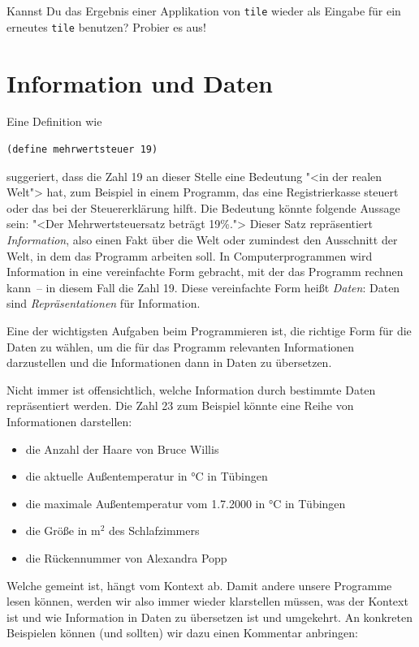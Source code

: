 \begin{aufgabeinline}
  Kannst Du das Ergebnis einer Applikation von
  \lstinline{tile} wieder als Eingabe für ein erneutes
  \lstinline{tile} benutzen?  Probier es aus!
\end{aufgabeinline}

\section{Information und Daten}
\label{sec:information-daten}

Eine Definition wie
%
\begin{lstlisting}
(define mehrwertsteuer 19)
\end{lstlisting}
%
suggeriert, dass die Zahl 19 an dieser Stelle eine Bedeutung "<in der
realen Welt"> hat, zum Beispiel in einem Programm, das eine Registrierkasse
steuert oder das bei der Steuererklärung hilft.  Die Bedeutung könnte
folgende Aussage sein: "<Der Mehrwertsteuersatz beträgt 19\%.">
Dieser Satz repräsentiert \textit{Information},
also einen Fakt über die Welt oder zumindest den Ausschnitt der Welt, in
dem das Programm arbeiten soll.  In Computerprogrammen wird
Information in eine vereinfachte Form gebracht, mit der das Programm
rechnen kann~-- in diesem Fall die Zahl 19.  Diese vereinfachte Form
heißt \textit{Daten}: Daten sind
\textit{Repräsentationen} für Information.

Eine der wichtigsten Aufgaben beim Programmieren ist, die richtige
Form für die Daten zu wählen, um die für das Programm relevanten
Informationen darzustellen und die Informationen dann in Daten zu
übersetzen.

Nicht immer ist offensichtlich, welche Information durch bestimmte
Daten repräsentiert werden.  Die Zahl 23 zum Beispiel könnte eine Reihe
von Informationen darstellen:
%
\begin{itemize}
\item die Anzahl der Haare von Bruce Willis
\item die aktuelle Außentemperatur in °C in Tübingen
\item die maximale Außentemperatur vom 1.7.2000 in °C in Tübingen
\item die Größe in m$^2$ des Schlafzimmers
\item die Rückennummer von Alexandra Popp
\end{itemize}
%
Welche gemeint ist, hängt vom Kontext ab.  Damit andere unsere
Programme lesen können, werden wir also immer wieder klarstellen
müssen, was der Kontext ist und wie Information in Daten zu übersetzen
ist und umgekehrt.  An konkreten Beispielen können (und sollten) wir
dazu einen Kommentar anbringen:

